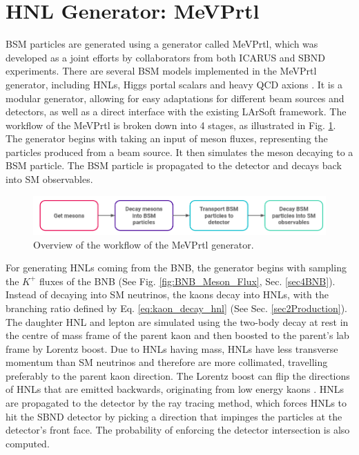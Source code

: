 \section{HNL Generator: MeVPrtl}
\label{sec:gen_mevprtl}

BSM particles are generated using a generator called MeVPrtl, which was developed as a joint efforts by collaborators from both ICARUS and SBND experiments.
There are several BSM models implemented in the MeVPrtl generator, including HNLs, Higgs portal scalars \cite{higgs_scalar} and heavy QCD axions \cite{qcd_axion}.
It is a modular generator, allowing for easy adaptations for different beam sources and detectors, as well as a direct interface with the existing LArSoft framework.
The workflow of the MeVPrtl is broken down into 4 stages, as illustrated in Fig. \ref{fig:MeVPrtl_Workflow}.
The generator begins with taking an input of meson fluxes, representing the particles produced from a beam source.
It then simulates the meson decaying to a BSM particle.
The BSM particle is propagated to the detector and decays back into SM observables.

\begin{figure}[htbp!] 
\centering    
\includegraphics[width=1.0\textwidth]{MeVPrtl_Workflow}
\caption[MeVPrtl Generator Workflow]{
Overview of the workflow of the MeVPrtl generator.
}
\label{fig:MeVPrtl_Workflow}
\end{figure}

For generating HNLs coming from the BNB, the generator begins with sampling the $K^{+}$ fluxes of the BNB (See Fig. \ref{fig:BNB_Meson_Flux}, Sec. \ref{sec4BNB}).
Instead of decaying into SM neutrinos, the kaons decay into HNLs, with the branching ratio defined by Eq. \ref{eq:kaon_decay_hnl} (See Sec. \ref{sec2Production}).
The daughter HNL and lepton are simulated using the two-body decay at rest in the centre of mass frame of the parent kaon and then boosted to the parent's lab frame by Lorentz boost.
Due to HNLs having mass, HNLs have less transverse momentum than SM neutrinos and therefore are more collimated, travelling preferably to the parent kaon direction.
The Lorentz boost can flip the directions of HNLs that are emitted backwards, originating from low energy kaons \cite{DavidePhD}.
HNLs are propagated to the detector by the ray tracing method, which forces HNLs to hit the SBND detector by picking a direction that impinges the particles at the detector's front face.  
The probability of enforcing the detector intersection is also computed.

